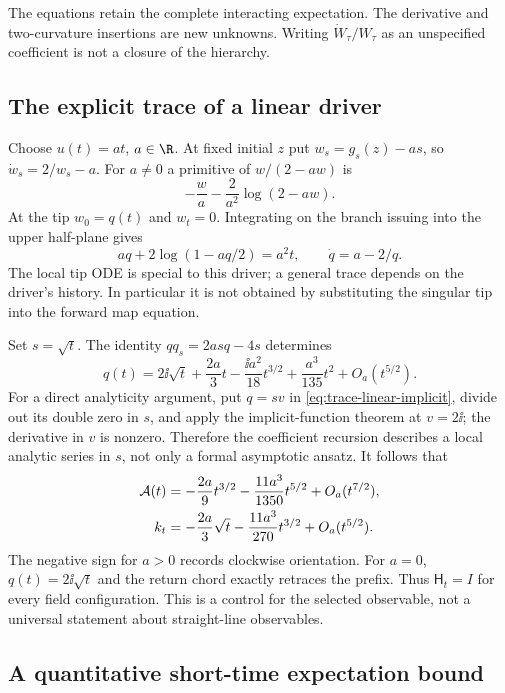 The equations retain the complete interacting expectation.
The derivative and two-curvature insertions are new unknowns.
Writing $\dot W_\tau/W_\tau$ as an unspecified coefficient is
not a closure of the hierarchy.

\subsection{The explicit trace of a linear driver}
\label{subsec:linear-trace}

Choose $u(t)=at$, $a\in\R$. At fixed initial $z$ put
$w_s=g_s(z)-as$, so $\dot w_s=2/w_s-a$. For $a\ne0$ a primitive
of $w/(2-aw)$ is
\[
 -\frac wa-\frac2{a^2}\log(2-aw).
\]
At the tip $w_0=q(t)$ and $w_t=0$. Integrating on the branch
issuing into the upper half-plane gives
\begin{equation}\label{eq:trace-linear-implicit}
 aq+2\log(1-aq/2)=a^2t,\qquad \dot q=a-2/q.
\end{equation}
The local tip ODE is special to this driver; a general trace
depends on the driver's history. In particular it is not obtained
by substituting the singular tip into the forward map equation.

Set $s=\sqrt t$. The identity $q q_s=2asq-4s$ determines
\begin{equation}\label{eq:trace-linear-series}
 q(t)=2\ii\sqrt t+\frac{2a}{3}t-\frac{\ii a^2}{18}t^{3/2}
                +\frac{a^3}{135}t^2+O_a(t^{5/2}).
\end{equation}
For a direct analyticity argument, put $q=sv$ in
\eqref{eq:trace-linear-implicit}, divide out its double zero in
$s$, and apply the implicit-function theorem at $v=2\ii$;
the derivative in $v$ is nonzero. Therefore the coefficient
recursion describes a local analytic series in $s$, not only a
formal asymptotic ansatz. It follows that
\begin{align}\label{eq:trace-area-series}
 \mathcal A(t)&=-\frac{2a}{9}t^{3/2}
                    -\frac{11a^3}{1350}t^{5/2}+O_a(t^{7/2}),\\
 k_t&=-\frac{2a}{3}\sqrt t
                    -\frac{11a^3}{270}t^{3/2}+O_a(t^{5/2}).
 \notag
\end{align}
The negative sign for $a>0$ records clockwise orientation. For
$a=0$, $q(t)=2\ii\sqrt t$ and the return chord exactly retraces
the prefix. Thus $\mathsf H_t=I$ for every field configuration.
This is a control for the selected observable, not a universal
statement about straight-line observables.

\subsection{A quantitative short-time expectation bound}

